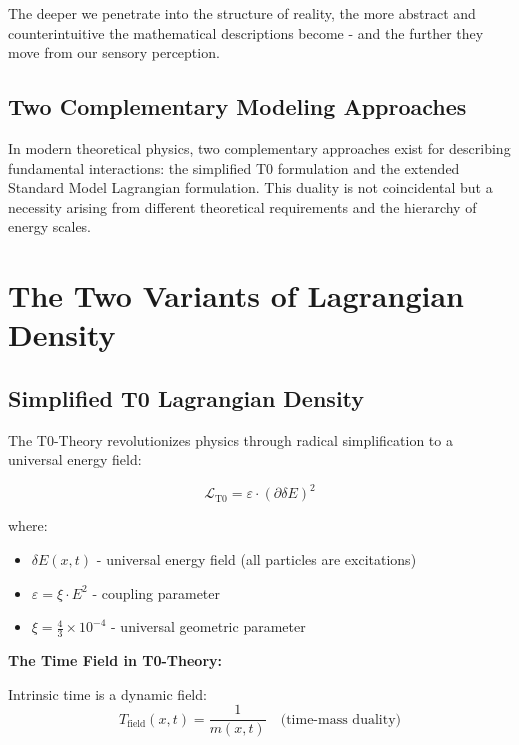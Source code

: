 \documentclass[12pt,a4paper]{article}
\begin{document}
	The deeper we penetrate into the structure of reality, the more abstract and counterintuitive the mathematical descriptions become - and the further they move from our sensory perception.
	
	\subsection{Two Complementary Modeling Approaches}
	
	In modern theoretical physics, two complementary approaches exist for describing fundamental interactions: the simplified T0 formulation and the extended Standard Model Lagrangian formulation. This duality is not coincidental but a necessity arising from different theoretical requirements and the hierarchy of energy scales.
	
	\section{The Two Variants of Lagrangian Density}
	
	\subsection{Simplified T0 Lagrangian Density}
	
	The T0-Theory revolutionizes physics through radical simplification to a universal energy field:
	
	\begin{t0box}
		\begin{equation}
			\mathcal{L}_{\text{T0}} = \varepsilon \cdot (\partial\delta E)^2
		\end{equation}
		
		where:
		\begin{itemize}
			\item $\delta E(x,t)$ - universal energy field (all particles are excitations)
			\item $\varepsilon = \xi \cdot E^2$ - coupling parameter
			\item $\xi = \frac{4}{3} \times 10^{-4}$ - universal geometric parameter
		\end{itemize}
	\end{t0box}
	
	\textbf{The Time Field in T0-Theory:}
	
	Intrinsic time is a dynamic field:
	\begin{equation}
		T_{\text{field}}(x,t) = \frac{1}{m(x,t)} \quad \text{(time-mass duality)}
	\end{equation}
	
\end{document}
